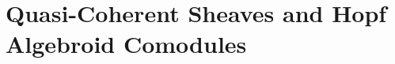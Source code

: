 \section{Quasi-Coherent Sheaves and Hopf Algebroid Comodules}\label{sec:chromatic-geometry-sheavesandcomodules}
